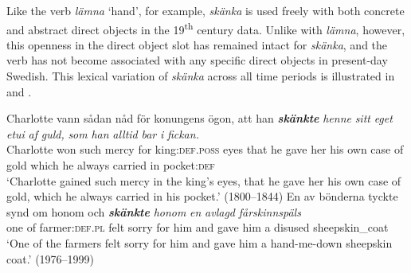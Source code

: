 \documentclass[output=paper]{langscibook}
\begin{document}
\begin{table}
\caption{Frequency measures of the verb{}-specific DOC with \textit{skänka} ‘give’}
\label{tab:valdeson:20}
\end{table}

Like the verb \textit{lämna} ‘hand’, for example, \textit{skänka} is used freely with both concrete and abstract direct objects in the 19\textsuperscript{th} century data. Unlike with \textit{lämna}, however, this openness in the direct object slot has remained intact for \textit{skänka}, and the verb has not become associated with any specific direct objects in present-day Swedish. This lexical variation of \textit{skänka} across all time periods is illustrated in  and .


\ea \label{ex:valdeson:32}
\gll Charlotte vann sådan  nåd      för    konungens    ögon,    att    han  \textbf{\textit{skänkte}} \textit{henne} \textit{sitt} \textit{eget} \textit{etui}   \textit{af} \textit{guld,} \textit{som} \textit{han} \textit{alltid} \textit{bar} \textit{i} \textit{fickan.} \\
  Charlotte   won such   mercy   for       {king:\textsc{def.poss}} eyes   that he gave       her       his own   case   of   gold which he   always carried  in   {pocket:\textsc{def}}\\
\glt ‘Charlotte gained such mercy in the king’s eyes, that he gave her his own case of gold, which he always carried in his pocket.’ (1800–1844)
\ex \label{ex:valdeson:33}
\ea \gll En     av   bönderna       tyckte   synd   om honom {och} \textbf{\textit{skänkte}} \textit{honom} \textit{en} \textit{avlagd} \textit{fårskinnspäls} \\
      one     of   farmer:\textsc{def}.\textsc{pl} felt       sorry   for   him and gave     him     a     disused     sheepskin\_coat\\   
\glt ‘One of the farmers felt sorry for him and gave him a hand-me-down sheepskin coat.’ (1976–1999)
\end{document}
